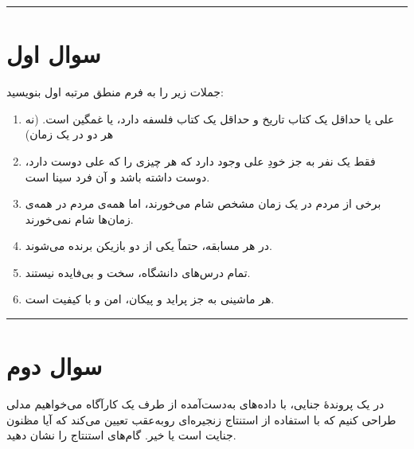 \documentclass[a4paper,10pt]{article}
\begin{document}
\vspace{8pt}
\textcolor{AccentCyan}{\rule{\linewidth}{0.8pt}}
\section{\textcolor{AccentGold}{سوال اول}}

جملات زیر را به فرم منطق مرتبه اول بنویسید:

\begin{enumerate}
	\item علی یا حداقل یک کتاب تاریخ و حداقل یک کتاب فلسفه دارد، یا غمگین است. (نه هر دو در یک زمان)
	\item فقط یک نفر به جز خودِ علی وجود دارد که هر چیزی را که علی دوست دارد، دوست داشته باشد و آن فرد سینا است.
	\item برخی از مردم در یک زمان مشخص شام می‌خورند، اما همه‌ی مردم در همه‌ی زمان‌ها شام نمی‌خورند.
	\item در هر مسابقه، حتماً یکی از دو بازیکن برنده می‌شوند.
	\item تمام درس‌های دانشگاه، سخت و بی‌فایده نیستند.
	\item هر ماشینی به جز پراید و پیکان، امن و با کیفیت است.
\end{enumerate}

\bigskip
\bigskip
\textcolor{AccentCyan}{\rule{\linewidth}{0.4pt}}
\pagebreak
\section{\textcolor{AccentGold}{سوال دوم}}
در یک پروندهٔ جنایی، با داده‌های به‌دست‌آمده از طرف یک کارآگاه می‌خواهیم مدلی طراحی کنیم که با استفاده از استنتاج زنجیره‌ای رو‌به‌عقب  تعیین می‌کند که آیا  مظنون جنایت است یا خیر. گام‌های استنتاج را نشان دهید.
\end{document}
